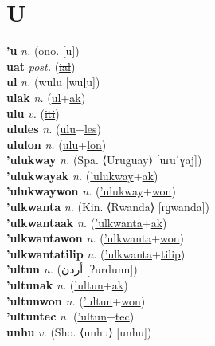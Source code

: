 \section{U}

\textbf{'u} \textit{n.} (ono. [u])
 \label{'u} \\
\textbf{uat} \textit{post.} (\hyperref[ial]{\sout{ial}})
 \label{uat} \\
\textbf{ul} \textit{n.} ({\javanese{}wulu} [wuɭu])
 \label{ul} \\
\textbf{ulak} \textit{n.} (\hyperref[ul]{ul}+\hyperref[ak]{ak})
 \label{ulak} \\
\textbf{ulu} \textit{v.} (\hyperref[iti]{\sout{iti}})
 \label{ulu} \\
\textbf{ulules} \textit{n.} (\hyperref[ulu]{ulu}+\hyperref[les]{les})
 \label{ulules} \\
\textbf{ululon} \textit{n.} (\hyperref[ulu]{ulu}+\hyperref[lon]{lon})
 \label{ululon} \\
\textbf{'ulukway} \textit{n.} (Spa. ⟨Uruguay⟩ [uɾuˈɣaj])
 \label{'ulukway} \\
\textbf{'ulukwayak} \textit{n.} (\hyperref['ulukway]{'ulukway}+\hyperref[ak]{ak})
 \label{'ulukwayak} \\
\textbf{'ulukwaywon} \textit{n.} (\hyperref['ulukway]{'ulukway}+\hyperref[won]{won})
 \label{'ulukwaywon} \\
\textbf{'ulkwanta} \textit{n.} (Kin. ⟨Rwanda⟩ [ɾɡwanda])
 \label{'ulkwanta} \\
\textbf{'ulkwantaak} \textit{n.} (\hyperref['ulkwanta]{'ulkwanta}+\hyperref[ak]{ak})
 \label{'ulkwantaak} \\
\textbf{'ulkwantawon} \textit{n.} (\hyperref['ulkwanta]{'ulkwanta}+\hyperref[won]{won})
 \label{'ulkwantawon} \\
\textbf{'ulkwantatilip} \textit{n.} (\hyperref['ulkwanta]{'ulkwanta}+\hyperref[tilip]{tilip})
 \label{'ulkwantatilip} \\
\textbf{'ultun} \textit{n.} ({\arabics{}ْأردن} [ʔurdunn])
 \label{'ultun} \\
\textbf{'ultunak} \textit{n.} (\hyperref['ultun]{'ultun}+\hyperref[ak]{ak})
 \label{'ultunak} \\
\textbf{'ultunwon} \textit{n.} (\hyperref['ultun]{'ultun}+\hyperref[won]{won})
 \label{'ultunwon} \\
\textbf{'ultuntec} \textit{n.} (\hyperref['ultun]{'ultun}+\hyperref[tec]{tec})
 \label{'ultuntec} \\
\textbf{unhu} \textit{v.} (Sho. ⟨unhu⟩ [unhu])
 \label{unhu} \\
